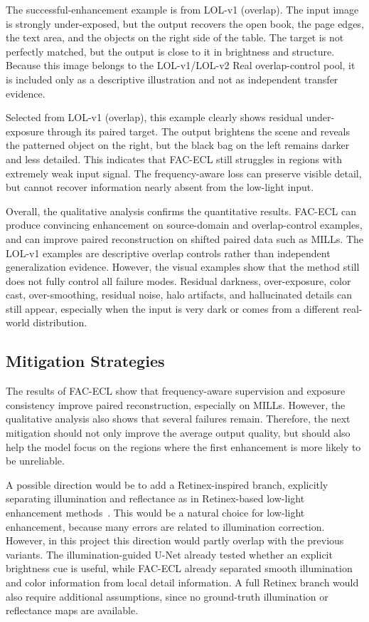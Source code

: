 The successful-enhancement example is from LOL-v1 (overlap). The input image is strongly under-exposed, but the output recovers the open book, the page edges, the text area, and the objects on the right side of the table. The target is not perfectly matched, but the output is close to it in brightness and structure. Because this image belongs to the LOL-v1/LOL-v2 Real overlap-control pool, it is included only as a descriptive illustration and not as independent transfer evidence.

Selected from LOL-v1 (overlap), this example clearly shows residual under-exposure through its paired target. The output brightens the scene and reveals the patterned object on the right, but the black bag on the left remains darker and less detailed. This indicates that FAC-ECL still struggles in regions with extremely weak input signal. The frequency-aware loss can preserve visible detail, but cannot recover information nearly absent from the low-light input.

Overall, the qualitative analysis confirms the quantitative results. FAC-ECL can produce convincing enhancement on source-domain and overlap-control examples, and can improve paired reconstruction on shifted paired data such as MILLs. The LOL-v1 examples are descriptive overlap controls rather than independent generalization evidence. However, the visual examples show that the method still does not fully control all failure modes. Residual darkness, over-exposure, color cast, over-smoothing, residual noise, halo artifacts, and hallucinated details can still appear, especially when the input is very dark or comes from a different real-world distribution.

\subsection{Mitigation Strategies}

The results of FAC-ECL show that frequency-aware supervision and exposure consistency improve paired reconstruction, especially on MILLs. However, the qualitative analysis also shows that several failures remain. Therefore, the next mitigation should not only improve the average output quality, but should also help the model focus on the regions where the first enhancement is more likely to be unreliable.

A possible direction would be to add a Retinex-inspired branch, explicitly separating illumination and reflectance as in Retinex-based low-light enhancement methods~\cite{DBLP:conf/bmvc/WeiWY018}. This would be a natural choice for low-light enhancement, because many errors are related to illumination correction. However, in this project this direction would partly overlap with the previous variants. The illumination-guided U-Net already tested whether an explicit brightness cue is useful, while FAC-ECL already separated smooth illumination and color information from local detail information. A full Retinex branch would also require additional assumptions, since no ground-truth illumination or reflectance maps are available.

